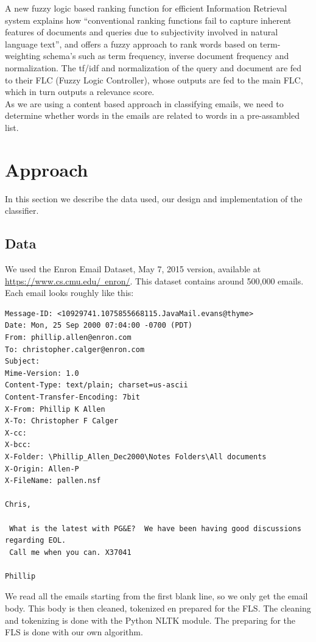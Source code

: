 \documentclass[journal]{IEEEtran}
\begin{document}
A new fuzzy logic based ranking function for efficient Information Retrieval 
system \cite{ranking} explains how ``conventional ranking functions
fail to capture inherent features of documents and queries due to subjectivity
involved in natural language text'', and offers a fuzzy approach to rank words
based on term-weighting schema's such as term frequency, inverse document
frequency and normalization. The tf/idf and normalization of the query and 
document are fed to their FLC (Fuzzy Logic Controller), whose outputs are fed 
to the main FLC, which in turn outputs a relevance score. \\

As we are using a content based approach in classifying emails, we need to 
determine whether words in the emails are related to words in a pre-assambled 
list.

\section{Approach}
In this section we describe the data used, our design and implementation of 
the classifier.

\subsection{Data}
We used the Enron Email Dataset, May 7, 2015 version, available at 
\href{https://www.cs.cmu.edu/~enron/}{https://www.cs.cmu.edu/~enron/}. This 
dataset contains around 500,000 emails. Each email looks roughly like this:

\begin{lstlisting}
Message-ID: <10929741.1075855668115.JavaMail.evans@thyme>
Date: Mon, 25 Sep 2000 07:04:00 -0700 (PDT)
From: phillip.allen@enron.com
To: christopher.calger@enron.com
Subject: 
Mime-Version: 1.0
Content-Type: text/plain; charset=us-ascii
Content-Transfer-Encoding: 7bit
X-From: Phillip K Allen
X-To: Christopher F Calger
X-cc: 
X-bcc: 
X-Folder: \Phillip_Allen_Dec2000\Notes Folders\All documents
X-Origin: Allen-P
X-FileName: pallen.nsf

Chris,

 What is the latest with PG&E?  We have been having good discussions 
regarding EOL.
 Call me when you can. X37041

Phillip
\end{lstlisting}

We read all the emails starting from the first blank line, so we only get 
the email body. This body is then cleaned, tokenized en prepared for the 
FLS. The cleaning and tokenizing is done with the Python NLTK module. The 
preparing for the FLS is done with our own algorithm.
\end{document}
